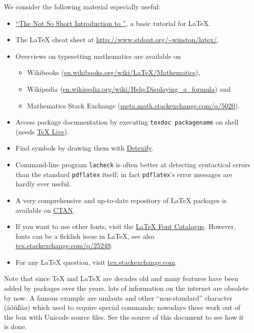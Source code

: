 \documentclass[]{rptuseminar}
\begin{document}
We consider the following material especially useful:
\begin{itemize}
	\item \href{http://mirrors.concertpass.com/tex-archive/info/lshort/english/lshort.pdf}{``The Not So Short Introduction to \LaTeXe''}, a basic tutorial for \LaTeX{}.
	\item The \LaTeX{} cheat sheet at \url{http://www.stdout.org/~winston/latex/}.
	\item Overviews on typesetting mathematics are available on
	  \begin{itemize}
	    \item Wikibooks (\href{http://en.wikibooks.org/wiki/LaTeX/Mathematics}{en.wikibooks.org/wiki/LaTeX/Mathematics}),
	    \item Wikipedia (\href{http://en.wikipedia.org/wiki/Help:Displaying_a_formula}{en.wikipedia.org/wiki/Help:Displaying\_a\_formula}) and
	    \item Mathematics Stack Exchange (\href{http://meta.math.stackexchange.com/q/5020/3330}{meta.math.stackexchange.com/q/5020}).
	  \end{itemize}
	\item Access package documentation by executing \texttt{texdoc packagename} on shell (needs
	\href{https://www.tug.org/texlive/}{TeX Live}).
	\item Find symbols by drawing them with \href{http://detexify.kirelabs.org}{Detexify}.
	\item Command-line program \texttt{lacheck} is often better at detecting syntactical errors than the standard \texttt{pdflatex}
	itself; in fact \texttt{pdflatex}'s error messages are hardly ever useful.
	\item A very comprehensive and up-to-date repository of \LaTeX{} packages is
	  available on \href{http://ctan.org/}{CTAN}.
	\item If you want to use other fonts, visit the \href{http://www.tug.dk/FontCatalogue/}{\LaTeX{} Font Catalogue}. However, fonts can be a ficklish issue in \LaTeX{}, see also
	  \href{http://tex.stackexchange.com/q/25249/3213}{tex.stackexchange.com/q/25249}.
	\item For any \LaTeX{} question, visit \href{http://tex.stackexchange.com}{tex.stackexchange.com}.
\end{itemize}
Note that since \TeX{} and \LaTeX{} are decades old and many features have been added by packages over the years, lots of information on the internet are obsolete by now.
A famous example are umlauts and other ``non-standard'' character  (äöüßåø) which used to require special commands; nowadays these work out of the box with Unicode source files.
See the source of this document to see how it is done.
\end{document}

